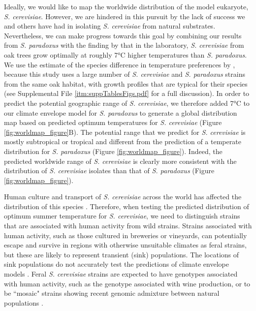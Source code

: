 \documentclass[12pt]{article}
\begin{document}
\begin{linenumbers}
Ideally, we would like to map the worldwide distribution of the model eukaryote, \textit{S. cerevisiae}. However, we are hindered in this pursuit by the lack of success we and others have had in isolating \textit{S. cerevisiae} from natural substrates. Nevertheless, we can make progress towards this goal by combining our results from \textit{S. paradoxus} with the finding by \citet{sweeney_sympatric_2004} that in the laboratory, \textit{S. cerevisiae} from oak trees grow optimally at roughly 7\si{\degreeCelsius} higher temperatures than \textit{S. paradoxus}. We use the estimate of the species difference in temperature preferences by \citet{sweeney_sympatric_2004}, because this study uses a large number of \textit{S. cerevisiae} and \textit{S. paradoxus} strains from the same oak habitat, with growth profiles that are typical for their species (see Supplemental File \ref{itm:suppTablesFigs.pdf} for a full discussion). In order to predict the potential geographic range of \textit{S. cerevisiae}, we therefore added 7\si{\degreeCelsius} to our climate envelope model for \textit{S. paradoxus} to generate a global distribution map based on predicted optimum temperatures for \textit{S. cerevisiae} (Figure \ref{fig:worldmap_figure}B). The potential range that we predict for \textit{S. cerevisiae} is mostly subtropical or tropical and different from the prediction of a temperate distribution for \textit{S. paradoxus} (Figure \ref{fig:worldmap_figure}). Indeed, the predicted worldwide range of \textit{S. cerevisiae} is clearly more consistent with the distribution of \textit{S. cerevisiae} isolates than that of \textit{S. paradoxus} (Figure \ref{fig:worldmap_figure}). 

Human culture and transport of \textit{S. cerevisiae} across the world has affected the distribution of this species \citep{fay_evidence_2005,liti_population_2009,wang_surprisingly_2012,cromie_genomic_2013}. Therefore, when testing the predicted distribution of optimum summer temperature for \textit{S. cerevisiae}, we need to distinguish strains that are associated with human activity from wild strains. Strains associated with human activity, such as those cultured in breweries or vineyards, can potentially escape and survive in regions with otherwise unsuitable climates as feral strains, but these are likely to represent transient (sink) populations. The locations of sink populations do not accurately test the predictions of climate envelope models \citep{araujo_uses_2012}. Feral \textit{S. cerevisiae} strains are expected to have genotypes associated with human activity, such as the genotype associated with wine production, or to be ``mosaic" strains showing recent genomic admixture between natural populations \citep{fay_evidence_2005,liti_population_2009,wang_surprisingly_2012,cromie_genomic_2013,almeida_population_2015}.


\end{linenumbers}
\end{document}

